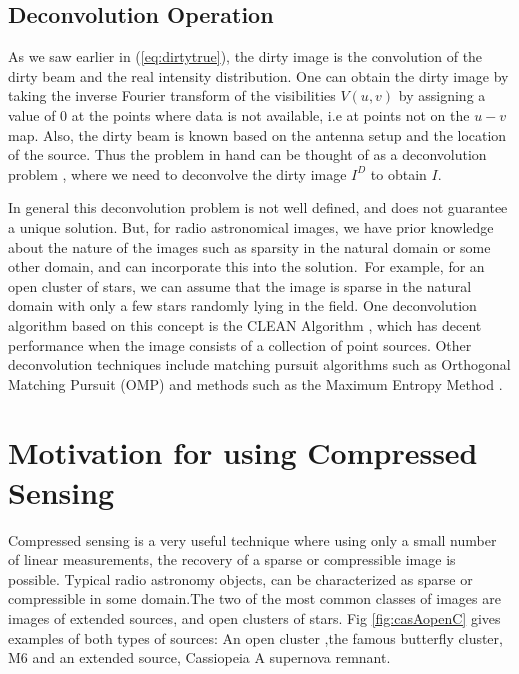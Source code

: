 %
%

\subsection{Deconvolution Operation}
As we saw earlier in (\ref{eq:dirtytrue}), the dirty image is the convolution of the dirty beam and the real intensity distribution.
One can obtain the dirty image by taking the inverse Fourier transform of the visibilities $V(u,v)$ by assigning a value of $0$ at the points where data is not available, i.e at points not on the $u-v$ map.
Also, the dirty beam is known based on the antenna setup and the location of the source. Thus the problem in hand can be thought of as  a deconvolution problem , where we need to deconvolve the dirty image 
$I^D$ to obtain $I$.

In general this deconvolution problem is not well defined, and does not guarantee a unique solution. But, for radio astronomical images, we have prior knowledge about the nature of the images such as sparsity in the natural domain or some other domain, and can incorporate this into the solution.\ For example, for an open cluster of stars, we can assume that the image is sparse in the natural domain with only a few stars randomly lying in the field. 
One deconvolution algorithm based on this concept is the CLEAN Algorithm \cite{ncra_book},  which has decent performance when the image consists of a collection of point sources.  Other deconvolution techniques include matching pursuit algorithms such as Orthogonal Matching Pursuit (OMP) and methods such as the Maximum Entropy Method \cite{ncra_book}.


\section{Motivation for using Compressed Sensing}
Compressed sensing is a very useful technique where using only a small number of linear measurements, the recovery of a sparse or compressible image is possible. Typical radio astronomy objects, can be characterized as sparse or compressible in some domain.The two of the most common classes of images are images of extended sources, and open clusters of stars.  
 Fig \ref{fig:casAopenC} gives examples of both types of sources: An open cluster ,the famous butterfly cluster, M$6$ and an extended source, Cassiopeia A supernova remnant.

